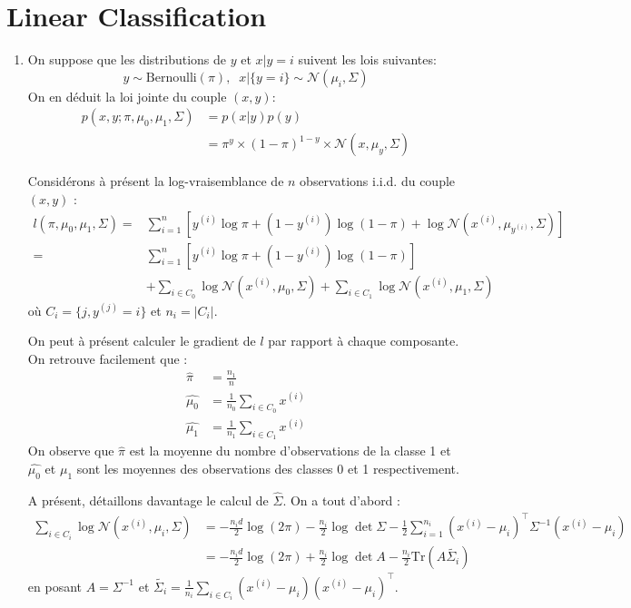 \documentclass{article}
\begin{document}
\section{Linear Classification}


\begin{enumerate}[label=(\alph*)]
\item On suppose que les distributions de $y$ et $x|y=i$ suivent les lois suivantes:
$$
y\sim \text{Bernoulli}(\pi),\;\; x|\{y=i\} \sim \mathcal{N}(\mu_i, \Sigma)
$$
On en déduit la loi jointe du couple $(x,y)$:
\begin{align*}
p(x, y; \pi, \mu_0, \mu_1, \Sigma) &= p(x|y)p(y)\\
&= \pi^y \times (1-\pi)^{1-y} \times \mathcal{N}(x, \mu_y, \Sigma)
\end{align*}

Considérons à présent la log-vraisemblance de $n$ observations i.i.d. du couple $(x,y)$ :
\begin{align*}
l(\pi, \mu_0, \mu_1, \Sigma) =& \sum_{i=1}^n \left[ y^{(i)} \log \pi + (1-y^{(i)})\log(1-\pi) + \log \mathcal{N}(x^{(i)}, \mu_{y^{(i)}}, \Sigma) \right]\\
=& \sum_{i=1}^n \left[ y^{(i)} \log \pi + (1-y^{(i)})\log(1-\pi)\right]\\
 &+ \sum_{i\in C_0} \log \mathcal{N}(x^{(i)}, \mu_0, \Sigma) + \sum_{i\in C_1} \log \mathcal{N}(x^{(i)}, \mu_1, \Sigma)
\end{align*}
où $C_i = \{j, y^{(j)} = i\}$ et $n_i = |C_i|$.

On peut à présent calculer le gradient de $l$ par rapport à chaque composante. On retrouve facilement que :
\begin{align*}
\hat{\pi} &= \frac{n_1}{n}\\
\hat{\mu_0} &= \frac{1}{n_0} \sum_{i\in C_0} x^{(i)}\\
\hat{\mu_1} &= \frac{1}{n_1} \sum_{i\in C_1} x^{(i)}
\end{align*}
On observe que $\hat{\pi}$ est la moyenne du nombre d'observations de la classe 1 et $\hat{\mu_0}$ et $\hat{\mu_1}$ sont les moyennes des observations des classes 0 et 1 respectivement.

A présent, détaillons davantage le calcul de $\hat{\Sigma}$. On a tout d'abord :
\begin{align*}
\sum_{i\in C_i} \log \mathcal{N}(x^{(i)}, \mu_i, \Sigma) &= -\frac{n_i d}{2} \log(2\pi) - \frac{n_i}{2}\log \det \Sigma - \frac{1}{2}\sum_{i=1}^{n_i}(x^{(i)}-\mu_i)^\intercal \Sigma^{-1} (x^{(i)}-\mu_i)\\
&= -\frac{n_i d}{2} \log(2\pi) + \frac{n_i}{2}\log \det A - \frac{n_i}{2} \text{Tr}(A\tilde{\Sigma_i})
\end{align*}
en posant $A = \Sigma^{-1}$ et $\tilde{\Sigma_i} = \frac{1}{n_i}\sum_{i\in C_i}(x^{(i)}-\mu_i)(x^{(i)}-\mu_i)^\intercal$.


\end{enumerate}
\end{document}
